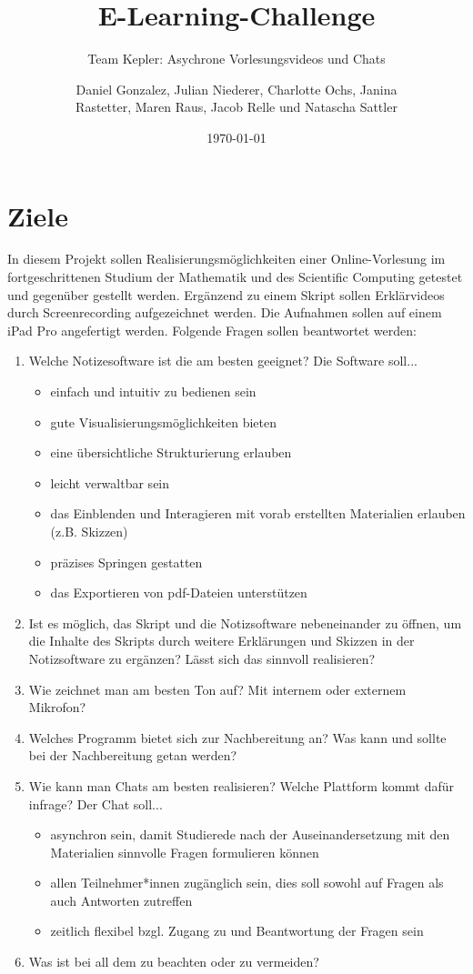 \documentclass[parskip=off,index=totocnumbered]{scrreprt}
\title{E-Learning-Challenge}
\subtitle{Team Kepler: Asychrone Vorlesungsvideos und Chats}
\author{Daniel Gonzalez, Julian Niederer, Charlotte Ochs, Janina\\Rastetter, Maren Raus, Jacob Relle und Natascha Sattler}
\date{\today}
\begin{document}
\maketitle
\tableofcontents

\chapter{Ziele}
In diesem Projekt sollen Realisierungsmöglichkeiten einer Online-Vorlesung im fortgeschrittenen Studium der Mathematik und des Scientific Computing getestet und gegenüber gestellt werden. Ergänzend zu einem Skript sollen Erklärvideos durch Screenrecording aufgezeichnet werden. Die Aufnahmen sollen auf einem iPad Pro angefertigt werden. Folgende Fragen sollen beantwortet werden:
\begin{enumerate}
\item Welche Notizesoftware ist die am besten geeignet? Die Software soll...
   \begin{itemize}
      \item einfach und intuitiv zu bedienen sein
      \item gute Visualisierungsmöglichkeiten bieten
      \item eine übersichtliche Strukturierung erlauben
      \item leicht verwaltbar sein
      \item das Einblenden und Interagieren mit vorab erstellten Materialien erlauben (z.B. Skizzen)
      \item präzises Springen gestatten
      \item das Exportieren von pdf-Dateien unterstützen
   \end{itemize}
\item Ist es möglich, das Skript und die Notizsoftware nebeneinander zu öffnen, um die Inhalte des Skripts durch weitere Erklärungen und Skizzen in der Notizsoftware zu ergänzen? Lässt sich das sinnvoll realisieren?
\item Wie zeichnet man am besten Ton auf? Mit internem oder externem Mikrofon?
\item Welches Programm bietet sich zur Nachbereitung an? Was kann und sollte bei der Nachbereitung getan werden?
\item Wie kann man Chats am besten realisieren? Welche Plattform kommt dafür infrage? Der Chat soll...
   \begin{itemize}
   \item asynchron sein, damit Studierede nach der Auseinandersetzung mit den Materialien sinnvolle Fragen formulieren können
   \item allen Teilnehmer*innen zugänglich sein, dies soll sowohl auf Fragen als auch Antworten zutreffen
   \item zeitlich flexibel bzgl. Zugang zu und Beantwortung der Fragen sein
   \end{itemize}
\item Was ist bei all dem zu beachten oder zu vermeiden?
\end{enumerate}
\end{document}
